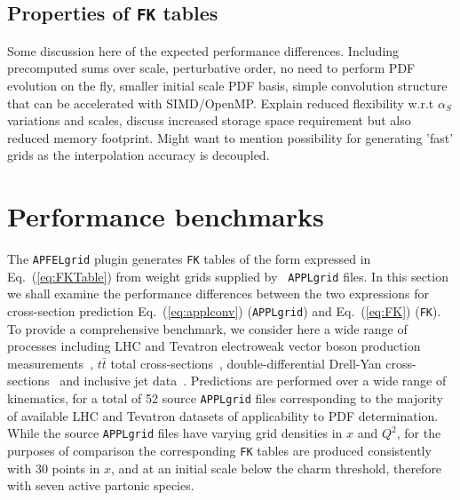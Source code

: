 \documentclass[preprint,12pt]{elsarticle}
\begin{document}
\subsection{Properties of {\tt FK} tables}
Some discussion here of the expected performance
differences. Including precomputed sums over scale, perturbative
order, no need to perform PDF evolution on the fly, smaller initial
scale PDF basis, simple convolution structure that can be accelerated
with SIMD/OpenMP.  Explain reduced flexibility w.r.t $\alpha_S$
variations and scales, discuss increased storage space requirement but
also reduced memory footprint.  Might want to mention possibility for
generating 'fast' grids as the interpolation accuracy is decoupled.

\section{Performance benchmarks}
\label{sec:benchmark}

The {\tt APFELgrid} plugin generates {\tt FK} tables of the form
expressed in Eq.~(\ref{eq:FKTable}) from weight grids supplied by {\tt
  APPLgrid} files. In this section we shall examine the performance
differences between the two expressions for cross-section prediction
Eq.~(\ref{eq:applconv}) ({\tt APPLgrid}) and Eq.~(\ref{eq:FK}) ({\tt FK}).
%
To provide a comprehensive benchmark, we consider here a wide range of
processes including LHC and Tevatron electroweak vector boson
production
measurements~\cite{Aaij:2012mda,Aaij:2012vn,Chatrchyan:2013mza,Chatrchyan:2013uja,Chatrchyan:2012xt,Aad:2013iua,Aad:2011fp,Aad:2011dm,Aaltonen:2010zza},
$t\bar{t}$ total
cross-sections~\cite{ATLAS:2012aa,ATLAS:2011xha,TheATLAScollaboration:2013dja,Chatrchyan:2013faa,Chatrchyan:2012bra,Chatrchyan:2012ria},
double-differential Drell-Yan
cross-sections~\cite{Chatrchyan:2013tia,CMS:2014jea} and inclusive jet
data~\cite{Chatrchyan:2012bja,Aad:2011fc,Aad:2013lpa,Abazov:2007jy}. Predictions
are performed over a wide range of kinematics, for a total of 52 source
{\tt APPLgrid} files corresponding to the majority of available LHC and Tevatron datasets of applicability to PDF determination.
While the source {\tt APPLgrid} files have varying grid densities in $x$ and $Q^2$, for the purposes of comparison the corresponding {\tt FK} tables are produced
consistently with 30 points in $x$, and at an initial scale below the charm threshold, therefore with seven active partonic species.
\end{document}
